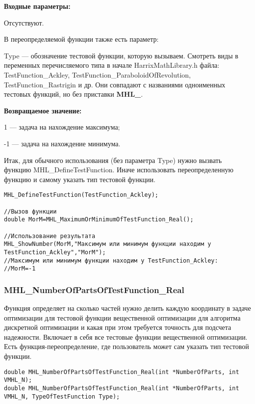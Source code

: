 \documentclass[a4paper,12pt]{article}
\begin{document}
\textbf{Входные параметры:}

Отсутствуют.

В переопределяемой функции также есть параметр:
  
Type --- обозначение тестовой функции, которую вызываем.
Смотреть виды в переменных перечисляемого типа в начале HarrixMathLibrary.h файла: TestFunction\_Ackley, TestFunction\_ParaboloidOfRevolution, TestFunction\_Rastrigin и др. Они совпадают с названиями одноименных тестовых функций, но без приставки \textbf{MHL\_}.

\textbf{Возвращаемое значение:}
 
1 --- задача на нахождение максимума;

-1 --- задача на нахождение минимума.

Итак, для обычного использования (без параметра Type) нужно вызвать функцию MHL\_DefineTestFunction. Иначе использовать переопределенную функцию и самому указать тип тестовой функции.


\begin{lstlisting}[label=code_use_MHL_MaximumOrMinimumOfTestFunction_Real,caption=Пример использования]
MHL_DefineTestFunction(TestFunction_Ackley);

//Вызов функции
double MorM=MHL_MaximumOrMinimumOfTestFunction_Real();

//Использование результата
MHL_ShowNumber(MorM,"Максимум или минимум функции находим у TestFunction_Ackley","MorM");
//Максимум или минимум функции находим у TestFunction_Ackley:
//MorM=-1
\end{lstlisting}

\subsubsection{MHL\_NumberOfPartsOfTestFunction\_Real}\label{MHL_NumberOfPartsOfTestFunction_Real}

Функция определяет на сколько частей нужно делить каждую координату в задаче оптимизации для тестовой функции вещественной оптимизации для алгоритма дискретной оптимизации и какая при этом требуется точность для подсчета надежности. Включает в себя все тестовые функции вещественной оптимизации. Есть функция-переопределение, где пользователь может сам указать тип тестовой функции.


\begin{lstlisting}[label=code_syntax_MHL_NumberOfPartsOfTestFunction_Real,caption=Синтаксис]
double MHL_NumberOfPartsOfTestFunction_Real(int *NumberOfParts, int VMHL_N);
double MHL_NumberOfPartsOfTestFunction_Real(int *NumberOfParts, int VMHL_N, TypeOfTestFunction Type);
\end{lstlisting}
\end{document}
